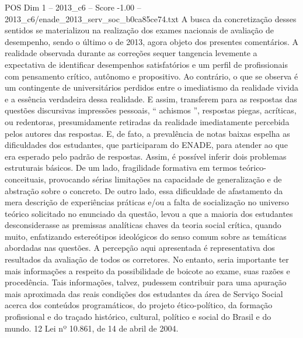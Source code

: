 \begin{textsample}{POS Dim 1 – 2013\_c6 – Score -1.00 – 2013\_c6/enade\_2013\_serv\_soc\_b0ca85ce74.txt}
A busca da concretização desses sentidos se materializou na realização dos exames nacionais de avaliação de desempenho, sendo o último o de 2013, agora objeto dos presentes comentários.
A realidade observada durante as correções sequer tangencia levemente a expectativa de identificar desempenhos satisfatórios e um perfil de profissionais com pensamento crítico, autônomo e propositivo.
Ao contrário, o que se observa é um contingente de universitários perdidos entre o imediatismo da realidade vivida e a essência verdadeira dessa realidade.
E assim, transferem para as respostas das questões discursivas impressões pessoais, “ achismos ”, respostas piegas, acríticas, ou redentoras, presumidamente retiradas da realidade imediatamente percebida pelos autores das respostas.
E, de fato, a prevalência de notas baixas espelha as dificuldades dos estudantes, que participaram do ENADE, para atender ao que era esperado pelo padrão de respostas.
Assim, é possível inferir dois problemas estruturais básicos.
De um lado, fragilidade formativa em termos teórico-conceituais, provocando sérias limitações na capacidade de generalização e de abstração sobre o concreto.
De outro lado, essa dificuldade de afastamento da mera descrição de experiências práticas e/ou a falta de socialização no universo teórico solicitado no enunciado da questão, levou a que a maioria dos estudantes desconsiderasse as premissas analíticas chaves da teoria social crítica, quando muito, enfatizando estereótipos ideológicos do senso comum sobre as temáticas abordadas nas questões.
A percepção aqui apresentada é representativa dos resultados da avaliação de todos os corretores.
No entanto, seria importante ter mais informações a respeito da possibilidade de boicote ao exame, suas razões e procedência.
Tais informações, talvez, pudessem contribuir para uma apuração mais aproximada das reais condições dos estudantes da área de Serviço Social acerca dos conteúdos programáticos, do projeto ético-político, da formação profissional e do traçado histórico, cultural, político e social do Brasil e do mundo. 12 Lei nº 10.861, de 14 de abril de 2004.

\end{textsample}
